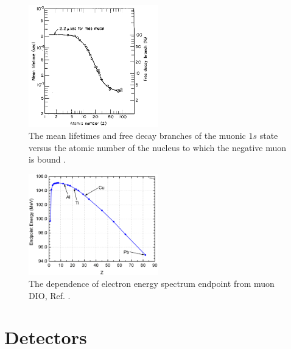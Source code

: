 \begin{figure}[!h]
\centering
\includegraphics[width =0.5\textwidth]{images/chapter2/lifetime_mu_matter.png}
\caption{ The mean lifetimes and free decay branches of the muonic $1s$ state versus the atomic number of the nucleus to which the negative muon is bound \cite{TYamazaki_1975}.}
\label{fig:muonicatom}
\end{figure}
\begin{figure}[!h]
\centering
\includegraphics[width =0.5\textwidth]{images/chapter2/endopint.png}
\caption{ The dependence of electron energy spectrum endpoint from muon DIO, Ref. \cite{dukes}.}
\label{fig:endpoint}
\end{figure}


\section{Detectors}
